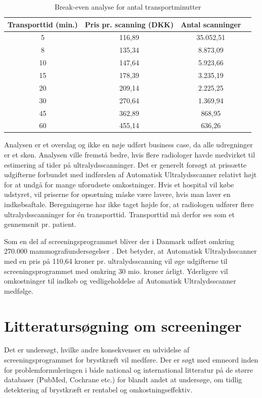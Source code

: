 \begin{table}[H]
\centering
\begin{tabular}{ | c | c | c | p{} | }
\hline
\textbf{Transporttid (min.)} & \textbf{Pris pr. scanning (DKK)} & \textbf{Antal scanninger} \\\hline
5 & 116,89 & 35.052,51 \\\hline
8 & 135,34 & 8.873,09\\\hline
10 & 147,64 & 5.923,66\\\hline
15 & 178,39 & 3.235,19 \\\hline
20 & 209,14 & 2.225,25\\\hline
30 & 270,64 & 1.369,94\\\hline
45 & 362,89 & 868,95 \\\hline
60 & 455,14 & 636,26 \\\hline
\end{tabular}
\caption{Break-even analyse for antal transportminutter}
\label{Breakeven}
\end{table}

Analysen er et overslag og ikke en nøje udført business case, da alle udregninger er et skøn. Analysen ville fremstå bedre, hvis  flere radiologer havde medvirket til estimering af tider på ultralydsscanninger. Det er generelt forsøgt at prissætte udgifterne forbundet med indførslen af Automatisk Ultralydsscanner relativt højt for at undgå for mange uforudsete omkostninger. Hvis et hospital vil købe udstyret, vil priserne for opsætning måske være lavere, hvis man laver en indkøbsaftale. Beregningerne har ikke taget højde for, at radiologen udfører flere ultralydsscanninger for én transporttid. Transporttid må derfor ses som et gennemsnit pr. patient.

Som en del af screeningsprogrammet bliver der i Danmark udført omkring 270.000 mammografiundersøgelser \cite{esundhed}. Det betyder, at Automatisk Ultralydsscanner med en pris på 110,64 kroner pr. ultralydsscanning vil øge udgifterne til screeningsprogrammet med omkring 30 mio. kroner årligt. Yderligere vil omkostninger til indkøb og vedligeholdelse af Automatisk Ultralydsscanner medfølge. 

\section{Litteratursøgning om screeninger}
Det er undersøgt, hvilke andre konsekvenser en udvidelse af screeningsprogrammet for brystkræft vil medføre. Der er søgt med emneord inden for problemformuleringen i både national og international litteratur på de større databaser (PubMed, Cochrane etc.) for blandt andet at undersøge, om tidlig detektering af brystkræft er rentabel og omkostningseffektiv. 


